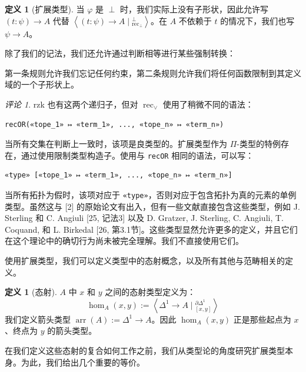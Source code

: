 \documentclass{ctexrep}
\theoremstyle{plain}
\theoremstyle{definition}
\newtheorem{definition}[theorem]{定义}
\theoremstyle{remark}
\newtheorem{remark}[theorem]{评论}
\theoremstyle{definition}
\theoremstyle{definition}
\theoremstyle{definition}
\newcommand{\coloneqq}{\mathrel{:=}}
\newcommand{\arr}{\operatorname{arr}}
\newcommand{\rec}{\operatorname{rec}}
\begin{document}
\begin{definition}[扩展类型]
当 $\varphi$ 是 $\perp$ 时，我们实际上没有子形状，因此允许写 $(t:\psi)\to A$ 代替 $\left\langle (t : \psi) \to A \mid {}^{\bot}_{\text{rec}_{\bot}} \right\rangle$。在 $A$ 不依赖于 $t$ 的情况下，我们也写 $\psi \to A$。

除了我们的记法，我们还允许通过判断相等进行某些强制转换：
第一条规则允许我们忘记任何约束，第二条规则允许我们将任何函数限制到其定义域的一个子形状上。
\end{definition}
\begin{remark}
rzk 也有这两个递归子，但对 $\rec_{\lor}$ 使用了稍微不同的语法：
\begin{verbatim}
recOR(«tope_1» ↦ «term_1», ..., «tope_n» ↦ «term_n»)
\end{verbatim}
当所有交集在判断上一致时，该项是良类型的。扩展类型作为 $\Pi$-类型的特例存在，通过使用限制类型构造子。使用与 \verb|recOR| 相同的语法，可以写：
\begin{verbatim}
«type» [«tope_1» ↦ «term_1», ..., «tope_n» ↦ «term_n»]
\end{verbatim}
当所有拓扑为假时，该项对应于 \verb|«type»|，否则对应于包含拓扑为真的元素的单例类型。虽然这与 [2] 的原始论文有出入，但有一些文献直接包含这些类型，例如 J. Sterling 和 C. Angiuli [25, 记法3] 以及 D. Gratzer, J. Sterling, C. Angiuli, T. Coquand, 和 L. Birkedal [26, 第3.1节]。这些类型显然允许更多的定义，并且它们在这个理论中的确切行为尚未被完全理解。我们不直接使用它们。
\end{remark}

使用扩展类型，我们可以定义类型中的态射概念，以及所有其他与范畴相关的定义。

\begin{definition}[态射]
$A$ 中 $x$ 和 $y$ 之间的态射类型定义为：
\[
\hom_A(x,y) \coloneqq \left\langle \Delta^1 \to A \mid {}^{\partial \Delta^1}_{[x, y]} \right\rangle
\]
我们定义箭头类型 $\arr(A) \coloneqq \Delta^1 \to A$。因此 $\hom_A(x,y)$ 正是那些起点为 $x$、终点为 $y$ 的箭头类型。
\end{definition}

在我们定义这些态射的复合如何工作之前，我们从类型论的角度研究扩展类型本身。为此，我们给出几个重要的等价。
\end{document}
